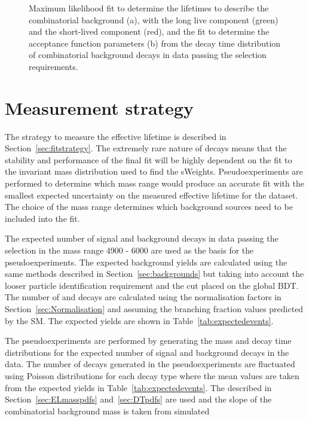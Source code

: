 \begin{figure}[tbp]
\begin{subfigure}[b]{0.48\textwidth}
   \end{subfigure}
    \caption{Maximum likelihood fit to determine the lifetimes to describe the combinatorial background (a), with the long live component (green) and the short-lived component (red), and the fit to determine the acceptance function parameters (b) from the decay time distribution of combinatorial background decays in data passing the \bhh selection requirements.}
    \label{fig:CBGaccpt}
\end{figure}



\section{Measurement strategy}%
\label{sec:toys}
The strategy to measure the \bsmumu effective lifetime is described in Section~\ref{sec:fitstrategy}. The extremely rare nature of \bsmumu decays means that the stability and performance of the final fit will be highly dependent on the fit to the invariant mass distribution used to find the sWeights. Pseudoexperiments are performed to determine which mass range would produce an accurate fit with the smallest expected uncertainty on the measured effective lifetime for the dataset. The choice of the mass range determines which background sources need to be included into the fit.


The expected number of signal and background decays in data passing the \bsmumu selection in the mass range 4900 - 6000 \mevcc are used as the basis for the pseudoexperiments. The expected background yields are calculated using the same methods described in Section~\ref{sec:backgrounds} but taking into account the looser particle identification requirement and the cut placed on the global BDT. The number of \bsmumu and \bdmumu decays are calculated using the normalisation factors in Section~\ref{sec:Normalisation} and assuming the branching fraction values predicted by the SM. The expected yields are shown in Table~\ref{tab:expectedevents}. 



The pseudoexperiments are performed by generating the mass and decay time distributions for the expected number of signal and background decays in the data. The number of decays generated in the pseudoexperiments are fluctuated using Poisson distributions for each decay type where the mean values are taken from the expected yields in Table~\ref{tab:expectedevents}. The \pdfs described in Section~\ref{sec:ELmasspdfs} and~\ref{sec:DTpdfs} are used and the slope of the combinatorial background mass \pdf is taken from simulated 


